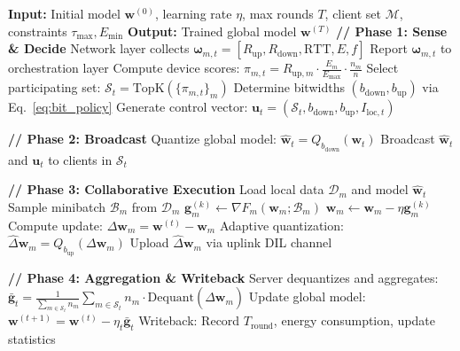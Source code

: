 \documentclass[journal]{IEEEtran}
\begin{document}
\begin{algorithm}[!t]
\caption{SA-FLQ: System-Aware Federated Low-bitwidth Quantization}
\label{alg:saflq}
\begin{algorithmic}[1]
\STATE \textbf{Input:} Initial model $\mathbf{w}^{(0)}$, learning rate $\eta$, max rounds $T$, client set $\mathcal{M}$, constraints $\tau_{\max}, E_{\min}$
\STATE \textbf{Output:} Trained global model $\mathbf{w}^{(T)}$
    \STATE \textbf{// Phase 1: Sense \& Decide}
        \STATE Network layer collects $\boldsymbol{\omega}_{m,t} = [R_{\text{up}}, R_{\text{down}}, \mathrm{RTT}, E, f]$
        \STATE Report $\boldsymbol{\omega}_{m,t}$ to orchestration layer
    \ENDFOR
    \STATE Compute device scores: $\pi_{m,t} = R_{\text{up},m} \cdot \frac{E_m}{E_{\max}} \cdot \frac{n_m}{n}$
    \STATE Select participating set: $\mathcal{S}_t = \text{TopK}(\{\pi_{m,t}\}_m)$
    \STATE Determine bitwidths $(b_{\text{down}}, b_{\text{up}})$ via Eq.~\eqref{eq:bit_policy}
    \STATE Generate control vector: $\mathbf{u}_t = (\mathcal{S}_t, b_{\text{down}}, b_{\text{up}}, I_{\text{loc},t})$
    
    \STATE \textbf{// Phase 2: Broadcast}
    \STATE Quantize global model: $\hat{\mathbf{w}}_t = Q_{b_{\text{down}}}(\mathbf{w}_t)$
    \STATE Broadcast $\hat{\mathbf{w}}_t$ and $\mathbf{u}_t$ to clients in $\mathcal{S}_t$
    
    \STATE \textbf{// Phase 3: Collaborative Execution}
        \STATE Load local data $\mathcal{D}_m$ and model $\hat{\mathbf{w}}_t$
            \STATE Sample minibatch $\mathcal{B}_m$ from $\mathcal{D}_m$
            \STATE $\mathbf{g}_m^{(k)} \leftarrow \nabla F_m(\mathbf{w}_m; \mathcal{B}_m)$
            \STATE $\mathbf{w}_m \leftarrow \mathbf{w}_m - \eta \mathbf{g}_m^{(k)}$
        \ENDFOR
        \STATE Compute update: $\Delta\mathbf{w}_m = \mathbf{w}^{(t)} - \mathbf{w}_m$
        \STATE Adaptive quantization: $\hat{\Delta}\mathbf{w}_m = Q_{b_{\text{up}}}(\Delta\mathbf{w}_m)$
        \STATE Upload $\hat{\Delta}\mathbf{w}_m$ via uplink DIL channel
    \ENDFOR
    
    \STATE \textbf{// Phase 4: Aggregation \& Writeback}
    \STATE Server dequantizes and aggregates:
    \STATE \quad $\bar{\mathbf{g}}_t = \frac{1}{\sum_{m \in \mathcal{S}_t} n_m} \sum_{m \in \mathcal{S}_t} n_m \cdot \text{Dequant}(\hat{\Delta}\mathbf{w}_m)$
    \STATE Update global model: $\mathbf{w}^{(t+1)} = \mathbf{w}^{(t)} - \eta_t \bar{\mathbf{g}}_t$
    \STATE Writeback: Record $T_{\text{round}}$, energy consumption, update statistics
\ENDFOR
\end{algorithmic}
\end{algorithm}
\end{document}
